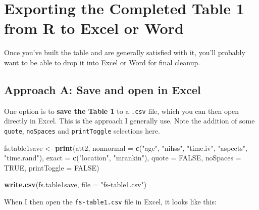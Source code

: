 \documentclass[]{book}
\newenvironment{Shaded}{\begin{snugshade}}{\end{snugshade}}
\newcommand{\KeywordTok}[1]{\textcolor[rgb]{0.13,0.29,0.53}{\textbf{#1}}}
\newcommand{\DataTypeTok}[1]{\textcolor[rgb]{0.13,0.29,0.53}{#1}}
\newcommand{\StringTok}[1]{\textcolor[rgb]{0.31,0.60,0.02}{#1}}
\newcommand{\OtherTok}[1]{\textcolor[rgb]{0.56,0.35,0.01}{#1}}
\newcommand{\NormalTok}[1]{#1}
\theoremstyle{definition}
\theoremstyle{definition}
\theoremstyle{definition}
\theoremstyle{remark}
\begin{document}
\section{Exporting the Completed Table 1 from R to Excel or
Word}\label{exporting-the-completed-table-1-from-r-to-excel-or-word}

Once you've built the table and are generally satisfied with it, you'll
probably want to be able to drop it into Excel or Word for final
cleanup.

\subsection{Approach A: Save and open in
Excel}\label{approach-a-save-and-open-in-excel}

One option is to \textbf{save the Table 1} to a \texttt{.csv} file,
which you can then open directly in Excel. This is the approach I
generally use. Note the addition of some \texttt{quote},
\texttt{noSpaces} and \texttt{printToggle} selections here.

\begin{Shaded}
\begin{Highlighting}[]
\NormalTok{fs.table1save <-}\StringTok{ }\KeywordTok{print}\NormalTok{(att2, }
      \DataTypeTok{nonnormal =} \KeywordTok{c}\NormalTok{(}\StringTok{"age"}\NormalTok{, }\StringTok{"nihss"}\NormalTok{, }\StringTok{"time.iv"}\NormalTok{, }\StringTok{"aspects"}\NormalTok{, }\StringTok{"time.rand"}\NormalTok{),}
      \DataTypeTok{exact =} \KeywordTok{c}\NormalTok{(}\StringTok{"location"}\NormalTok{, }\StringTok{"mrankin"}\NormalTok{),}
      \DataTypeTok{quote =} \OtherTok{FALSE}\NormalTok{, }\DataTypeTok{noSpaces =} \OtherTok{TRUE}\NormalTok{, }\DataTypeTok{printToggle =} \OtherTok{FALSE}\NormalTok{)}

\KeywordTok{write.csv}\NormalTok{(fs.table1save, }\DataTypeTok{file =} \StringTok{"fs-table1.csv"}\NormalTok{)}
\end{Highlighting}
\end{Shaded}

When I then open the \texttt{fs-table1.csv} file in Excel, it looks like
this:
\end{document}
